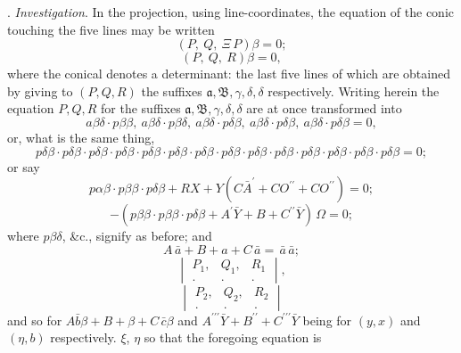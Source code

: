 \documentclass[11pt,a4paper]{book}
\begin{document}
. \textit{Investigation}. In the projection, using line-coordinates, the equation of the
conic touching the five lines may be written
\[
(P,\ Q,\ \Xi\,P)\beta = 0;
\]
\[
(P,\ Q,\ R)\beta = 0,
\]
where the conical denotes a determinant: the last five lines of which are obtained by
giving to $(P, Q, R)$ the suffixes $\mathfrak{a}, \mathfrak{B}, \gamma, \delta, \delta$ respectively. Writing herein the equation
$P, Q, R$ for the suffixes $\mathfrak{a}, \mathfrak{B}, \gamma, \delta, \delta$ are at once transformed
into
\[
a\beta\delta\cdot p\beta\beta,\ a\beta\delta\cdot p\beta\delta,\ a\beta\delta\cdot p\delta\beta,\ a\beta\delta\cdot p\delta\beta,\ a\beta\delta\cdot p\delta\beta = 0,
\]
or, what is the same thing,
\[
p\delta\beta\cdot p\delta\beta\cdot p\delta\beta\cdot p\delta\beta\cdot p\delta\beta\cdot p\delta\beta\cdot p\delta\beta\cdot p\delta\beta\cdot p\delta\beta\cdot p\delta\beta\cdot p\delta\beta\cdot p\delta\beta\cdot p\delta\beta\cdot p\delta\beta = 0;
\]
or say
\[
p\alpha\beta\cdot p\beta\beta\cdot p\delta\beta + RX + Y(C\bar{A}^{\prime}+CO^{\prime\prime}+CO^{\prime\prime}) = 0;
\]
\[
- (p\beta\beta\cdot p\beta\beta\cdot p\delta\beta + A^{\prime}\bar{Y} + B + C^{\prime\prime}\bar{Y})\,\Omega = 0;
\]
where $p\beta\delta$, \&c., signify as before; and
\[
A\,\bar{a}+B+a+C\,\bar{a}=\,\bar{a}\,\bar{a};
\]
\[
\begin{vmatrix}
P_1, & Q_1, & R_1 \\
. & . & .
\end{vmatrix},
\]
\[
\begin{vmatrix}
P_2, & Q_2, & R_2 \\
. & . & .
\end{vmatrix}
\]
and so for $\mathit{A}\bar{b}\beta + B+\beta + C\,\bar{c}\beta$ and $A^{\prime\prime\prime}\bar{Y} + B^{\prime\prime} + C^{\prime\prime\prime}\bar{Y}$ being for $(y, x)$ and $(\eta, b)$ respectively.
$\xi$, $\eta$ so that the foregoing equation is
\end{document}
